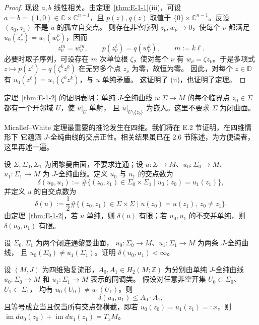 \begin{proof}
现设 $a,b$ 线性相关。由定理~\ref{thm:E-1-1}(iii)，可设
$a=b=(1,0)\in\mathbb C\times\mathbb C^{n-1}$，且 $p(z),q(z)$ 取值于
$\{0\}\times\mathbb C^{n-1}$。反设 $(z_0,z_1)$ 不是 $u$ 的孤立自交点。
则存在非零序列 $z_\nu,w_\nu\to0$，使每个 $\nu$ 都满足
$u_0(z_\nu^\ell)=u_1(w_\nu^k)$，因而
\[
  z_\nu^m=w_\nu^m,\qquad
  p(z_\nu^\ell)=q(w_\nu^k),\qquad m:=k\ell.
\]
必要时取子序列，可设存在 $m$ 次单位根 $\zeta$，使对每个 $\nu$ 有
$w_\nu=\zeta z_\nu$。于是多项式
$z\mapsto p(z^\ell)-q(\zeta^kz^k)$ 在无穷多个点 $z_\nu$ 为零，故恒为零。
因此，对每个 $z\in\mathbb D$ 有
$u_0(z^\ell)=u_1(\zeta^kz^k)$，与 $u$ 单纯矛盾。
这证明了 (ii)，也证明了定理。
\end{proof}

\begin{remark}\label{rem:E-1-3}
定理~\ref{thm:E-1-2} 的证明表明：单纯 $J$-全纯曲线 $u:\Sigma\to M$
的每个临界点 $z_0\in\Sigma$ 都有一个开邻域 $U$，使 $u|_U$ 单射，
且 $u|_{U\setminus\{z_0\}}$ 为嵌入。这里不要求 $\Sigma$ 为闭曲面。
\end{remark}

Micallef--White 定理最重要的推论发生在四维。我们将在 E.2 节证明，在四维情形下
它蕴涵 $J$-全纯曲线的交点正性。相关结果虽已在 2.6 节陈述，为方便读者，
这里再述一遍。

设 $\Sigma,\Sigma_0,\Sigma_1$ 为闭黎曼曲面，不要求连通；设
$u:\Sigma\to M$、$u_0:\Sigma_0\to M$、$u_1:\Sigma_1\to M$
为 $J$-全纯曲线。定义 $u_0$ 与 $u_1$ 的交点数为
\[
  \delta(u_0,u_1):=
  \#\{(z_0,z_1)\in\Sigma_0\times\Sigma_1\mid u_0(z_0)=u_1(z_1)\},
\]
并定义 $u$ 的自交点数为
\[
  \delta(u):=\frac12\#\{(z_0,z_1)\in\Sigma\times\Sigma\mid
    u(z_0)=u(z_1),\ z_0\ne z_1\}.
\]
由定理~\ref{thm:E-1-2}，若 $u$ 单纯，则 $\delta(u)$ 有限；若
$u_0,u_1$ 的不交并单纯，则 $\delta(u_0,u_1)$ 有限。

\begin{exercise}\label{ex:E-1-4}
设 $\Sigma_0,\Sigma_1$ 为两个闭连通黎曼曲面，
$u_0:\Sigma_0\to M$、$u_1:\Sigma_1\to M$ 为两条 $J$-全纯曲线，
且 $u_0(\Sigma_0)\ne u_1(\Sigma_1)$。证明 $\delta(u_0,u_1)<\infty$。
\end{exercise}

\begin{theorem}\label{thm:E-1-5}
设 $(M,J)$ 为四维殆复流形，$A_0,A_1\in H_2(M;\mathbb Z)$ 为分别由单纯
$J$-全纯曲线 $u_0:\Sigma_0\to M$ 和 $u_1:\Sigma_1\to M$ 表示的同调类。
假设对任意非空开集 $U_0\subset\Sigma_0$、$U_1\subset\Sigma_1$，
均有 $u_0(U_0)\ne u_1(U_1)$。则
\[
  \delta(u_0,u_1)\le A_0\cdot A_1,
\]
且等号成立当且仅当所有交点都横截，即若
$u_0(z_0)=u_1(z_1)=:x$，则
$\operatorname{im}du_0(z_0)+\operatorname{im}du_1(z_1)=T_xM$。
\end{theorem}

